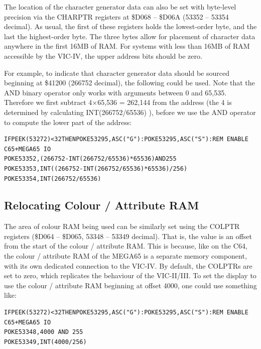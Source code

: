 The location of the character generator data can also be set with byte-level precision via the CHARPTR registers at \$D068 -- \$D06A (53352 -- 53354 decimal). As usual, the first of these registers holds the lowest-order byte, and the last the highest-order byte. The three bytes allow for placement of character data anywhere in the first 16MB of RAM. For systems with less than 16MB of RAM accessible by the VIC-IV, the upper address bits should be zero.

For example, to indicate that character generator data should be sourced beginning at \$41200 (266752 decimal), the following
could be used.  Note that the AND binary operator only works with arguments between 0 and 65,535. Therefore we first
subtract 4$\times$65,536 = 262,144 from the address (the 4 is determined by calculating INT(266752/65536) ), before we use the AND operator to compute the lower part of the address:

\begin{tcolorbox}[colback=black,coltext=white]
\verbatimfont{\codefont}
\begin{verbatim}
IFPEEK(53272)<32THENPOKE53295,ASC("G"):POKE53295,ASC("S"):REM ENABLE C65+MEGA65 IO
POKE53352,(266752-INT(266752/65536)*65536)AND255
POKE53353,INT((266752-INT(266752/65536)*65536)/256)
POKE53354,INT(266752/65536)
\end{verbatim}
\end{tcolorbox}


\subsection{Relocating Colour / Attribute RAM}

The area of colour RAM being used can be similarly set using the COLPTR registers (\$D064 -- \$D065, 53348 -- 53349 decimal). That is, the value is an offset from the start of the colour / attribute RAM.  This is because, like on the C64, the colour / attribute RAM of the MEGA65 is a separate memory component, with its own dedicated connection to the VIC-IV.  By default, the COLPTRs are set to zero, which replicates the behaviour of the VIC-II/III.  To set the display to use the colour / attribute RAM beginning at offset 4000, one could use something like:

\begin{tcolorbox}[colback=black,coltext=white]
\verbatimfont{\codefont}
\begin{verbatim}
IFPEEK(53272)<32THENPOKE53295,ASC("G"):POKE53295,ASC("S"):REM ENABLE C65+MEGA65 IO
POKE53348,4000 AND 255
POKE53349,INT(4000/256)
\end{verbatim}
\end{tcolorbox}

